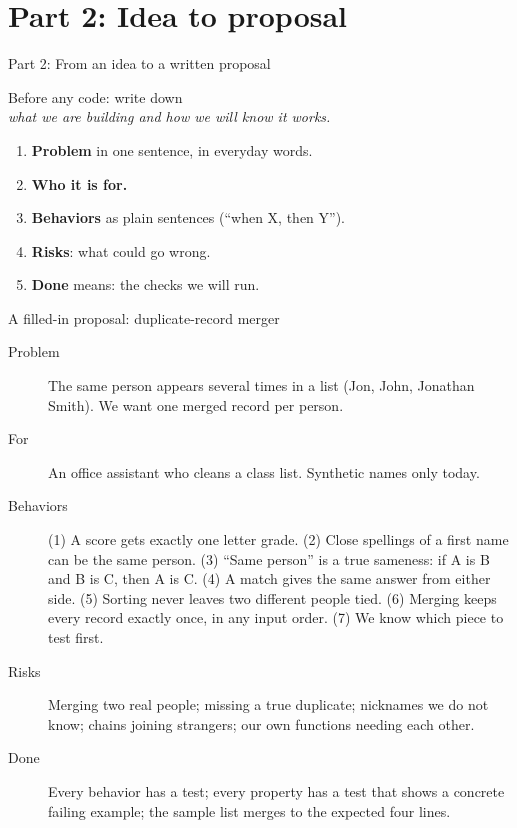 \section{Part 2: Idea to proposal}
\begin{frame}{Part 2: From an idea to a written proposal}
\begin{center}\Large Before any code: write down\\ \emph{what we are building and how we will know it works.}\end{center}
\vspace{6pt}
\begin{enumerate}
\item \textbf{Problem} in one sentence, in everyday words.
\item \textbf{Who it is for.}
\item \textbf{Behaviors} as plain sentences (``when X, then Y'').
\item \textbf{Risks}: what could go wrong.
\item \textbf{Done} means: the checks we will run.
\end{enumerate}
\end{frame}

\begin{frame}{A filled-in proposal: duplicate-record merger}
\small
\begin{description}
\item[Problem] The same person appears several times in a list (Jon, John, Jonathan Smith). We want one merged record per person.
\item[For] An office assistant who cleans a class list. Synthetic names only today.
\item[Behaviors] (1) A score gets exactly one letter grade. (2) Close spellings of a first name can be the same person. (3) ``Same person'' is a true sameness: if A is B and B is C, then A is C. (4) A match gives the same answer from either side. (5) Sorting never leaves two different people tied. (6) Merging keeps every record exactly once, in any input order. (7) We know which piece to test first.
\item[Risks] Merging two real people; missing a true duplicate; nicknames we do not know; chains joining strangers; our own functions needing each other.
\item[Done] Every behavior has a test; every property has a test that shows a concrete failing example; the sample list merges to the expected four lines.
\end{description}
\end{frame}

